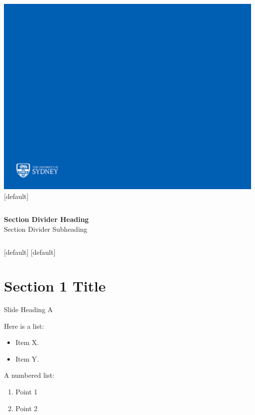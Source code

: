 \documentclass{beamer}
\begin{document}
{\includegraphics[width=\paperwidth,height=\paperheight]{sectiondivstd2jun16.pdf}}
[default]

\begin{frame}
\vspace{1cm}
\begin{columns}
\column{5.5cm}
{\bf{\color{usydwhite}Section Divider Heading}}	\\	%
{\color{usydwhite}Section Divider Subheading}		%

\column{6cm}
\end{columns}
\end{frame}


%
[default]
[default]

\section{Section 1 Title}


\begin{frame}{Slide Heading A}

Here is a list:
\begin{itemize}
\item Item X.
\item Item Y.
\end{itemize}

\bigskip

A numbered list:
\begin{enumerate}
\item Point 1
\item Point 2
\end{enumerate}

\end{frame}
\end{document}
